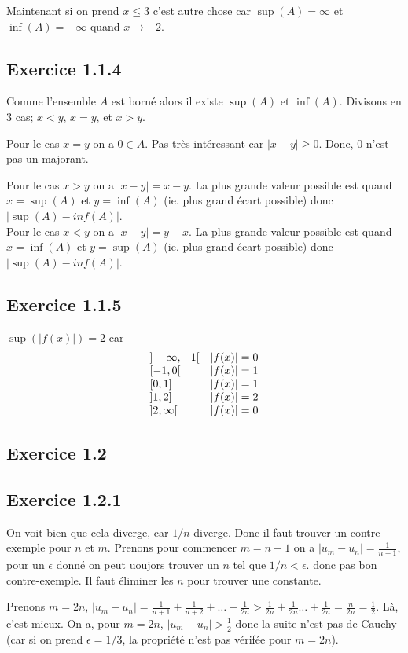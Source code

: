 \documentclass[]{book}
\theoremstyle{definition}
\begin{document}
Maintenant si on prend $x \leq 3$ c'est autre chose car $\sup(A) = \infty$ et $\inf(A) = -\infty$ quand $x \to -2$.

\subsection*{Exercice 1.1.4}
Comme l'ensemble $A$ est born\'e alors il existe $\sup(A)$ et $\inf(A)$. Divisons en 3 cas; $x < y$, $x=y$, et $x > y$.

Pour le cas $x=y$ on a $0 \in A$. Pas tr\`es int\'eressant car $|x-y| \geq 0$. Donc, 0 n'est pas un majorant. 

Pour le cas $x>y$ on a $|x-y| = x - y$. La plus grande valeur possible est quand $x=\sup(A)$ et $y = \inf(A)$ (ie. plus grand \'ecart possible) donc $|\sup(A)-inf(A)|$. \\
Pour le cas $x<y$ on a $|x-y| = y - x$. La plus grande valeur possible est quand $x=\inf(A)$ et $y = \sup(A)$ (ie. plus grand \'ecart possible) donc $|\sup(A)-inf(A)|$. \\


\subsection*{Exercice 1.1.5}
$\sup(|f(x)|) = 2$ car 
$$
\begin{array}{l l}
{]-\infty,-1[} & |f(x)| = 0 \\
{[-1,0[} & |f(x)| = 1 \\
{[0, 1]} & |f(x)| = 1 \\
{]1,2]} & |f(x)| = 2 \\
{]2,\infty[} & |f(x)| = 0 \\
\end{array}
$$

\subsection*{Exercice 1.2}
\subsection*{Exercice 1.2.1}
On voit bien que cela diverge, car $1/n$ diverge. Donc il faut trouver un contre-exemple pour $n$ et $m$.
Prenons pour commencer $m=n+1$ on a $|u_m-u_n| = \frac{1}{n+1}$, pour un $\epsilon$ donn\'e on peut uoujors trouver un $n$ tel que $1/n < \epsilon$. donc pas bon contre-exemple. Il faut \'eliminer les $n$ pour trouver une constante.

Prenons $m=2n$, $|u_m-u_n| = \frac{1}{n+1} + \frac{1}{n+2} + \ldots + \frac{1}{2n} > \frac{1}{2n} + \frac{1}{2n} \ldots + \frac{1}{2n} = \frac{n}{2n} = \frac{1}{2}$. L\`a, c'est mieux. On a, pour $m=2n$, $|u_m-u_n| > \frac{1}{2}$ donc la suite n'est pas de Cauchy (car si on prend $\epsilon = 1/3$, la propri\'et\'e n'est pas v\'erif\'ee pour $m=2n$).
\end{document}

